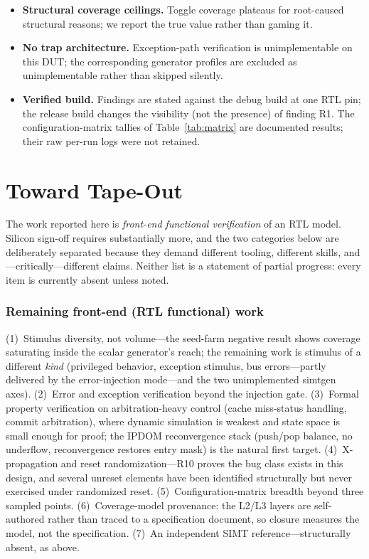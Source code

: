 \documentclass[conference]{IEEEtran}
\begin{document}
\begin{itemize}
	      therefore unsound, and per-mnemonic claims are drawn only from
	      post-remediation measurements.
	\item \textbf{Structural coverage ceilings.} Toggle coverage plateaus
	      for root-caused structural reasons; we report the true value rather
	      than gaming it.
	\item \textbf{No trap architecture.} Exception-path verification is
	      unimplementable on this DUT; the corresponding generator profiles are
	      excluded as unimplementable rather than skipped silently.
	\item \textbf{Verified build.} Findings are stated against the debug
	      build at one RTL pin; the release build changes the visibility (not the
	      presence) of finding R1. The configuration-matrix tallies of
	      Table~\ref{tab:matrix} are documented results; their raw per-run logs
	      were not retained.
\end{itemize}

\section{Toward Tape-Out}
\label{sec:tapeout}

The work reported here is \emph{front-end functional verification} of an
RTL model. Silicon sign-off requires substantially more, and the two
categories below are deliberately separated because they demand different
tooling, different skills, and---critically---different claims. Neither
list is a statement of partial progress: every item is currently absent
unless noted.

\subsubsection{Remaining front-end (RTL functional) work}
(1)~Stimulus diversity, not volume---the seed-farm negative result
shows coverage saturating inside the scalar generator's reach; the
remaining work is stimulus of a different \emph{kind} (privileged
behavior, exception stimulus, bus errors---partly delivered by the
error-injection mode---and the two unimplemented simtgen axes).
(2)~Error and exception verification beyond the injection gate.
(3)~Formal property verification on arbitration-heavy control (cache
miss-status handling, commit arbitration), where dynamic simulation is
weakest and state space is small enough for proof; the IPDOM
reconvergence stack (push/pop balance, no underflow, reconvergence
restores entry mask) is the natural first target.
(4)~X-propagation and reset randomization---R10 proves the bug class
exists in this design, and several unreset elements have been
identified structurally but never exercised under randomized reset.
(5)~Configuration-matrix breadth beyond three sampled points.
(6)~Coverage-model provenance: the L2/L3 layers are self-authored
rather than traced to a specification document, so closure measures the
model, not the specification.
(7)~An independent SIMT reference---structurally absent, as above.
\end{document}
